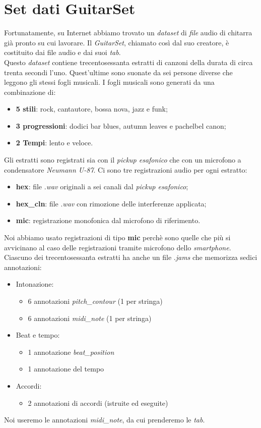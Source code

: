 \section{Set dati GuitarSet}
Fortunatamente, su Internet abbiamo trovato un \textit{dataset} di \textit{file} audio di chitarra già pronto su cui lavorare. Il \textit{GuitarSet}, chiamato così dal suo creatore, è costituito dai file audio e dai suoi \textit{tab}.\\
\newline
Questo \textit{dataset} contiene trecentosessanta estratti di canzoni della durata di circa trenta secondi l'uno. Quest'ultime sono suonate da sei persone diverse che leggono gli stessi fogli musicali. I fogli musicali sono generati da una combinazione di:
\begin{itemize}
	\item \textbf{5 stili}: rock, cantautore, bossa nova, jazz e funk;
	\item \textbf{3 progressioni}: dodici bar blues, autumn leaves e pachelbel canon;
	\item \textbf{2 Tempi}: lento e veloce.
\end{itemize}
Gli estratti sono registrati sia con il \textit{pickup esafonico} che con un microfono a condensatore \textit{Neumann U-87}.
Ci sono tre registrazioni audio per ogni estratto:
\begin{itemize}
	\item \textbf{hex}: file .\textit{wav} originali a sei canali dal \textit{pickup esafonico};
	\item \textbf{hex\_cln}: file .\textit{wav} con rimozione delle interferenze applicata;
	\item \textbf{mic}: registrazione monofonica dal microfono di riferimento.
\end{itemize}
Noi abbiamo usato registrazioni di tipo \textbf{mic} perchè sono quelle che più si avvicinano al caso delle registrazioni tramite microfono dello \textit{smartphone}.\\
\newline
Ciascuno dei trecentosessanta estratti ha anche un file .\textit{jams} che memorizza sedici annotazioni:
\begin{itemize}
	\item Intonazione:
	\begin{itemize}
		\item 6 annotazioni \textit{pitch\_contour} (1 per stringa)
		\item 6 annotazioni \textit{midi\_note} (1 per stringa)
	\end{itemize}
	\item Beat e tempo:
	\begin{itemize}
		\item 1 annotazione \textit{beat\_position}
		\item 1 annotazione del tempo
	\end{itemize}
	\item Accordi:
	\begin{itemize}
		\item 2 annotazioni di accordi (istruite ed eseguite)
	\end{itemize}
\end{itemize}
Noi useremo le annotazioni \textit{midi\_note}, da cui prenderemo le \textit{tab}.
